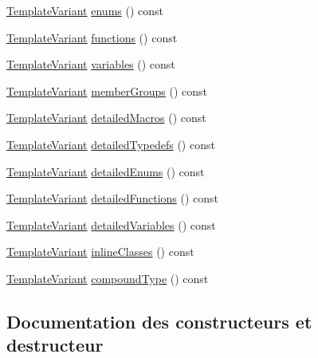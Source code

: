 \begin{DoxyCompactItemize}
\item 
\hyperlink{class_template_variant}{Template\+Variant} \hyperlink{class_file_context_1_1_private_a76a90fe5417186b372cb72b3a6b168d3}{enums} () const 
\item 
\hyperlink{class_template_variant}{Template\+Variant} \hyperlink{class_file_context_1_1_private_a179d94557ec85f2754fac97fffb170ed}{functions} () const 
\item 
\hyperlink{class_template_variant}{Template\+Variant} \hyperlink{class_file_context_1_1_private_a0fe6064d17d0f783623a56eab5361ebe}{variables} () const 
\item 
\hyperlink{class_template_variant}{Template\+Variant} \hyperlink{class_file_context_1_1_private_a22ad316e03ff27cb1041db7e9b130d8f}{member\+Groups} () const 
\item 
\hyperlink{class_template_variant}{Template\+Variant} \hyperlink{class_file_context_1_1_private_adbbeea39daec634a2dac1ceb7fe37cf2}{detailed\+Macros} () const 
\item 
\hyperlink{class_template_variant}{Template\+Variant} \hyperlink{class_file_context_1_1_private_a67fed74b05cc1f4f7c06de77f3764a5d}{detailed\+Typedefs} () const 
\item 
\hyperlink{class_template_variant}{Template\+Variant} \hyperlink{class_file_context_1_1_private_ac5b9f586268e5b06ede3c3f4441d43fc}{detailed\+Enums} () const 
\item 
\hyperlink{class_template_variant}{Template\+Variant} \hyperlink{class_file_context_1_1_private_adc66dde5e5f5a02b823b0d21bf670b72}{detailed\+Functions} () const 
\item 
\hyperlink{class_template_variant}{Template\+Variant} \hyperlink{class_file_context_1_1_private_a850ff0bf29dd1ed8f94e8ee5b946f959}{detailed\+Variables} () const 
\item 
\hyperlink{class_template_variant}{Template\+Variant} \hyperlink{class_file_context_1_1_private_af5aa39e3bc8d4b783d6d1c6585854f9c}{inline\+Classes} () const 
\item 
\hyperlink{class_template_variant}{Template\+Variant} \hyperlink{class_file_context_1_1_private_aa2d9ad7f173de6f3f7a050fac2802e21}{compound\+Type} () const 
\end{DoxyCompactItemize}


\subsection{Documentation des constructeurs et destructeur}
\hypertarget{class_file_context_1_1_private_aa524d442ceb7b106d226bbd258800b98}{}

